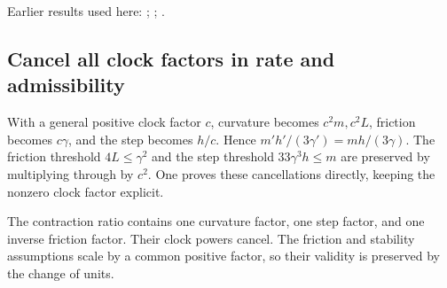 \documentclass[11pt,a4paper]{report}
\begin{document}
Earlier results used here: \cite[Section~3.1.1]{LangevinLean2026IPLA}; \cite[Section~3.113.3]{LangevinLean2026Kinetic}; \cite[Section~3.20.5]{LangevinLean2026Kinetic}.
\subsection{\texorpdfstring{Cancel all clock factors in rate and admissibility}{Cancel all clock factors in rate and admissibility}}
\label{report-step-KIPLMC-OBABOBound-lean-2}


With a general positive clock factor \(c\), curvature becomes \(c^2m,c^2L\), friction becomes \(c\gamma\), and the step becomes \(h/c\). Hence \(m\prime h\prime/(3\gamma\prime)=mh/(3\gamma)\). The friction threshold \(4L\le\gamma^2\) and the step threshold \(33\gamma^3h\le m\) are preserved by multiplying through by \(c^2\). One proves these cancellations directly, keeping the nonzero clock factor explicit.



The contraction ratio contains one curvature factor, one step factor, and one inverse friction factor. Their clock powers cancel. The friction and stability assumptions scale by a common positive factor, so their validity is preserved by the change of units.
\end{document}
